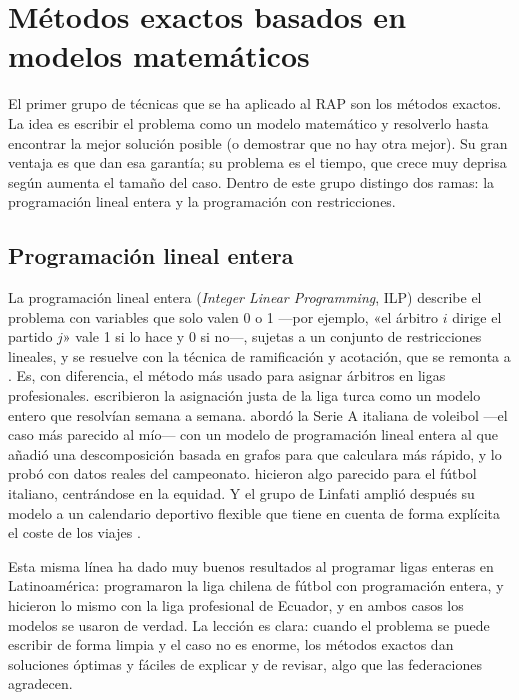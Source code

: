 \documentclass[11pt,a4paper,spanish]{book}
\numberwithin{equation}{chapter}
\numberwithin{figure}{chapter}
\numberwithin{table}{chapter}
\begin{document}
\section{Métodos exactos basados en modelos matemáticos}
\label{sec:exactos}

El primer grupo de técnicas que se ha aplicado al RAP son los métodos exactos. La idea es escribir el problema como un modelo matemático y resolverlo hasta encontrar la mejor solución posible (o demostrar que no hay otra mejor). Su gran ventaja es que dan esa garantía; su problema es el tiempo, que crece muy deprisa según aumenta el tamaño del caso. Dentro de este grupo distingo dos ramas: la programación lineal entera y la programación con restricciones.

\subsection{Programación lineal entera}

La programación lineal entera (\emph{Integer Linear Programming}, ILP) describe el problema con variables que solo valen 0 o 1 —por ejemplo, «el árbitro $i$ dirige el partido $j$» vale 1 si lo hace y 0 si no—, sujetas a un conjunto de restricciones lineales, y se resuelve con la técnica de ramificación y acotación, que se remonta a . Es, con diferencia, el método más usado para asignar árbitros en ligas profesionales.  escribieron la asignación justa de la liga turca como un modelo entero que resolvían semana a semana.  abordó la Serie A italiana de voleibol —el caso más parecido al mío— con un modelo de programación lineal entera al que añadió una descomposición basada en grafos para que calculara más rápido, y lo probó con datos reales del campeonato.  hicieron algo parecido para el fútbol italiano, centrándose en la equidad. Y el grupo de Linfati amplió después su modelo a un calendario deportivo flexible que tiene en cuenta de forma explícita el coste de los viajes \cite{linfati2019flexible}.

Esta misma línea ha dado muy buenos resultados al programar ligas enteras en Latinoamérica:  programaron la liga chilena de fútbol con programación entera, y  hicieron lo mismo con la liga profesional de Ecuador, y en ambos casos los modelos se usaron de verdad. La lección es clara: cuando el problema se puede escribir de forma limpia y el caso no es enorme, los métodos exactos dan soluciones óptimas y fáciles de explicar y de revisar, algo que las federaciones agradecen.
\end{document}
